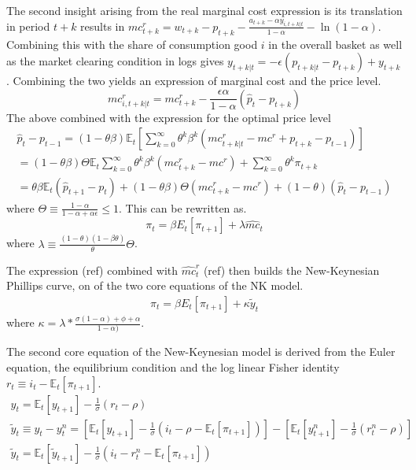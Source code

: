 \documentclass[12pt,a4paper,english]{article} %
\newcommand{\E}{\mathbb{E}} %
\begin{document}
	The second insight arising from the real marginal cost  expression is its translation in period $t+k$ results in $mc_{t+k}^r = w_{t+k} - p_{t+k} - \frac{a_ {t+k} - \alpha y_{i,t+k|t}}{1 - \alpha} - \ln(1 - \alpha)$. Combining this with the share of consumption good $i$ in the overall basket as well as the market clearing condition in logs gives $y_{t+k|t} = -\epsilon(p_{t+k|t} - p_{t+k}) + y_{t+k}$. Combining the two yields an expression of marginal cost and the price level.
	\begin{equation}
		mc_{i, t+k|t}^r = mc_{t+k}^r - \frac{\epsilon \alpha}{1 - \alpha}(\hat{p}_t - p_{t+k})
	\end{equation}
	The above combined with the expression for the optimal price level
	\begin{equation}
		\begin{aligned}
			\hat{p}_t - p_{t-1} =
			(1 - \theta \beta) \E_t
			\left[
			\sum_{k=0}^{\infty} \theta^k \beta^k \left( mc_{t+k|t}^r - mc^r +p_{t+k} - p_{t-1}\right)
			\right] \\			
			=
			(1 - \theta \beta) \Theta \E_t
			\sum_{k=0}^{\infty} \theta^k \beta^k (mc_{t+k}^r - mc^r) + 
			\sum_{k=0}^{\infty} \theta^k \pi_{t+k} \\
			=
			\theta \beta \E_t (\hat{p}_{t+1} - p_{t}) + (1 - \theta \beta) \Theta (mc_{t+k}^r - mc^r) + (1 - \theta) (\hat{p}_t - p_{t-1})
		\end{aligned}		
	\end{equation}
	where $\Theta \equiv \frac{1 - \alpha}{1 - \alpha + \alpha \epsilon} \leq 1$. This can be rewritten as.
	\begin{equation}
		\pi_t = \beta E_t [\pi_{t+1}] + \lambda \hat{mc}_{t}
	\end{equation}
	where $\lambda \equiv \frac{(1-\theta)(1-\beta\theta)}{\theta} \Theta$.
	
	The expression (ref) combined with $\hat{mc}_t^r$ (ref) then builds the New-Keynesian Phillips curve, on of the two core equations of the NK model.
	\begin{equation}
		\begin{aligned}
			\pi_t = \beta E_t [\pi_{t+1}] + \kappa \tilde{y}_t
		\end{aligned}
	\end{equation}
	where $\kappa = \lambda * \frac{\sigma (1 - \alpha) + \phi + \alpha}
	{1 - \alpha)}$.
	
	The second core equation of the New-Keynesian model is derived from the Euler equation, the equilibrium condition and the log linear Fisher identity $r_t \equiv i_t - \E_t[\pi_{t+1}]$.
	\begin{equation}
		\begin{aligned}
			y_t = \E_t[y_{t+1}] - \frac{1}{\sigma} (r_t - \rho) \\
			\tilde{y}_t \equiv y_t - y_t^n = 
			\left[
			\E_t[y_{t+1}] - \frac{1}{\sigma} (i_t - \rho - \E_t[\pi_{t+1}])
			\right]
			-
			\left[
			\E_t[y_{t+1}^n] - \frac{1}{\sigma} (r_t^n - \rho)
			\right]\\
			\tilde{y}_t = \E_t[\tilde{y}_{t+1}] - \frac{1}{\sigma} (i_t - r_t^n - \E_t[\pi_{t+1}])
		\end{aligned}
	\end{equation}
	
\end{document}
